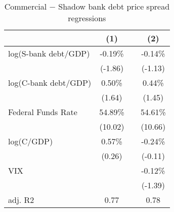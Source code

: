 \documentclass[letterpaper,12pt,dvipsnames,usenames]{article}
\theoremstyle{plain}
\begin{document}
\begin{table}[!ht] 
\caption{Commercial $-$ Shadow bank debt price spread regressions}
\centering{}{\small{} }%

\begin{tabular}{lccc}
\toprule
   & (1)  & & (2) \\    
 \midrule 
log(S-bank debt/GDP)  & -0.19\%  & & -0.14\%        \\    
                                           & (-1.86)    &  & (-1.13)  \\
log(C-bank debt/GDP)   &  0.50\% &  & 0.44\%  \\                
									       & (1.64)     & & (1.45)     \\
Federal Funds Rate          & 54.89\%  & &  54.61\%  \\         
										   & (10.02)   &  & (10.66)    \\         
log(C/GDP)                       & 0.57\%    & &  -0.24\%   \\                  
   									      & (0.26)    & &   (-0.11) \\        
 VIX                                     &            &   &  -0.12\%  \\                 
                                            &            &   &   (-1.39)   \\                 
 \midrule 
adj. R2                                 &  0.77  &   & 0.78         \\      
\bottomrule

\end{tabular}
\label{tab:cal_gameps}
 \end{table}
\end{document}
